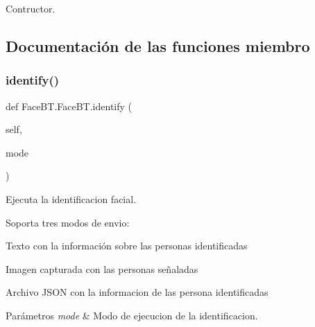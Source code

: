 Contructor. 



\subsection{Documentación de las funciones miembro}
\mbox{\label{class_face_b_t_1_1_face_b_t_a52e80d7d39f01c59794927eba5ff833d}} 
\subsubsection{\texorpdfstring{identify()}{identify()}}
{\footnotesize\ttfamily def Face\+B\+T.\+Face\+B\+T.\+identify (\begin{DoxyParamCaption}\item[{}]{self,  }\item[{}]{mode }\end{DoxyParamCaption})}



Ejecuta la identificacion facial. 

Soporta tres modos de envio\+:~\newline

\begin{DoxyItemize}
\item Texto con la información sobre las personas identificadas~\newline

\item Imagen capturada con las personas señaladas~\newline

\item Archivo J\+S\+ON con la informacion de las persona identificadas~\newline

\begin{DoxyParams}{Parámetros}
{\em mode} & Modo de ejecucion de la identificacion. \\
\hline
\end{DoxyParams}

\end{DoxyItemize}\mbox{\label{class_face_b_t_1_1_face_b_t_af35d86c0311c080589128342dcb414a0}} 
